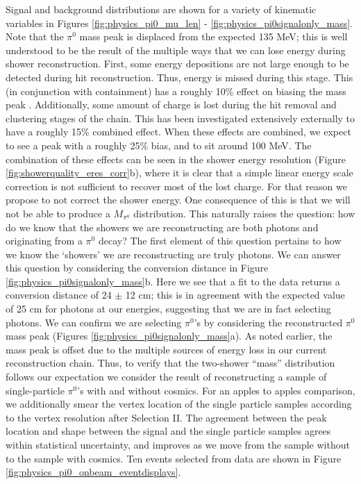 Signal and background distributions are shown for a variety of kinematic variables in Figures \ref{fig:physics_pi0_mu_len} - \ref{fig:physics_pi0signalonly_mass}. Note that the $\pi^0$ mass peak is displaced from the expected 135 MeV; this is well understood to be the result of the multiple ways that we can lose energy during shower reconstruction. First, some energy depositions are not large enough to be detected during hit reconstruction. Thus, energy is missed during this stage. This (in conjunction with containment) has a roughly 10\% effect on biasing the mass peak \cite{bib:davidc_hitthresholding}. Additionally, some amount of charge is lost during the hit removal and clustering stages of the chain.  This has been investigated extensively externally \cite{bib:davidc_missingE} to have a roughly 15\% combined effect. When these effects are combined, we expect to see a peak with a roughly 25\% bias, and to sit around 100 MeV. The combination of these effects can be seen in the shower energy resolution (Figure \ref{fig:showerquality_eres_corr}b), where it is clear that a simple linear energy scale correction is not sufficient to recover most of the lost charge. For that reason we propose to not correct the shower energy. One consequence of this is that we will not be able to produce a $M_{\pi^0}$ distribution. This naturally raises the question: how do we know that the showers we are reconstructing are both photons and originating from a $\pi^0$ decay? The first element of this question pertains to how we know the `showers’ we are reconstructing are truly photons. We can answer this question by considering the conversion distance in Figure \ref{fig:physics_pi0signalonly_mass}b.  Here we see that a fit to the data returns a conversion distance of 24 $\pm$ 12 cm; this is in agreement with the expected value of 25 cm for photons at our energies, suggesting that we are in fact selecting photons. We can confirm we are selecting $\pi^0$'s by considering the reconstructed $\pi^0$ mass peak (Figures \ref{fig:physics_pi0signalonly_mass}a).  As noted earlier, the mass peak is offset due to the multiple sources of energy loss in our current reconstruction chain. Thus, to verify that the two-shower “mass” distribution follows our expectation we consider the result of reconstructing a sample of single-particle $\pi^0$’s with and without cosmics. For an apples to apples comparison, we additionally smear the vertex location of the single particle samples according to the vertex resolution after Selection II.  The agreement between the peak location and shape between the signal and the single particle samples agrees within statistical uncertainty, and improves as we move from the sample without to the sample with cosmics. 
Ten events selected from data are shown in Figure \ref{fig:physics_pi0_onbeam_eventdisplays}.


